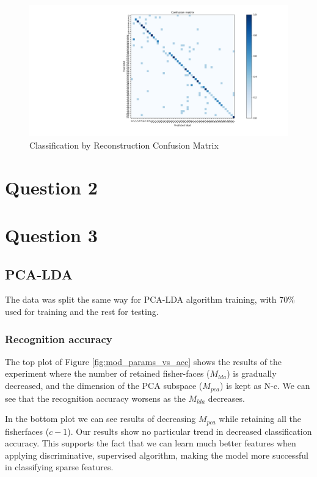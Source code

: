 \documentclass[10pt,technote]{IEEEtran}
\begin{document}
\begin{figure}
    \centering
    \includegraphics[width=\linewidth]{../results/1bb/confusion_rec.png}
    \caption{Classification by Reconstruction Confusion Matrix}
    \label{fig:REC_conf_mat}
\end{figure}

\section{Question 2}



\section{Question 3}
\subsection{PCA-LDA}
The data was split the same way for PCA-LDA algorithm training, with 70\% used for training and the rest for testing. 

\subsubsection{Recognition accuracy}
The top plot of Figure \ref{fig:mod_params_vs_acc} shows the results of  the experiment where the number of retained fisher-faces ($M_{lda}$) is gradually decreased, and the dimension of the PCA subspace ($M_{pca}$) is kept as N-c. We can see that the recognition accuracy worsens as the $M_{lda}$ decreases.

In the bottom plot we can see results of decreasing $M_{pca}$ while retaining all the fisherfaces ($c-1$). Our results show no particular trend in decreased classification accuracy. This supports the fact that we can learn much better features when applying discriminative, supervised algorithm, making the model more successful in classifying sparse features.
\end{document}
